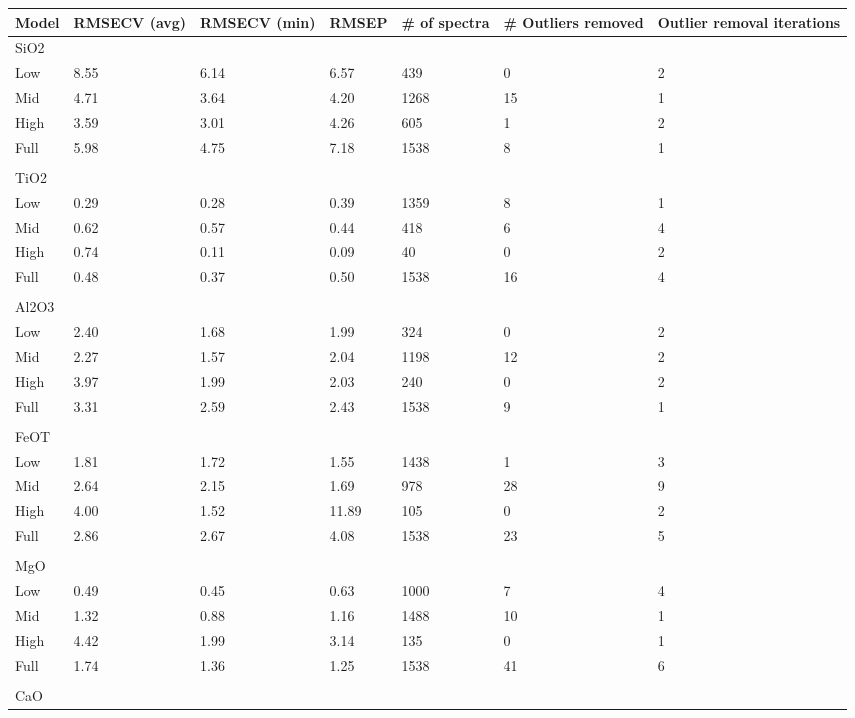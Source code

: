 \begin{table}[htbp] %
\centering
\begin{tabular*}{\textwidth}{@{\extracolsep{\fill}} lllllll}
\hline
Model & RMSECV (avg) & RMSECV (min) & RMSEP & \# of spectra & \# Outliers removed & Outlier removal iterations  \\
\hline
SiO2 &&&&&& \\
  Low & 8.55 & 6.14 & 6.57 & 439 & 0 & 2 \\
  Mid & 4.71 & 3.64 & 4.20 & 1268 & 15 & 1 \\
  High & 3.59 & 3.01 & 4.26 & 605 & 1 & 2 \\
  Full & 5.98 & 4.75 & 7.18 & 1538 & 8 & 1 \\
\\
TiO2 &&&&&& \\
  Low & 0.29 & 0.28 & 0.39 & 1359 & 8 & 1 \\
  Mid & 0.62 & 0.57 & 0.44 & 418 & 6 & 4 \\
  High & 0.74 & 0.11 & 0.09 & 40 & 0 & 2 \\
  Full & 0.48 & 0.37 & 0.50 & 1538 & 16 & 4 \\
\\
Al2O3 &&&&&& \\
  Low & 2.40 & 1.68 & 1.99 & 324 & 0 & 2 \\
  Mid & 2.27 & 1.57 & 2.04 & 1198 & 12 & 2 \\
  High & 3.97 & 1.99 & 2.03 & 240 & 0 & 2 \\
  Full & 3.31 & 2.59 & 2.43 & 1538 & 9 & 1 \\
\\
FeOT &&&&&& \\
  Low & 1.81 & 1.72 & 1.55 & 1438 & 1 & 3 \\
  Mid & 2.64 & 2.15 & 1.69 & 978 & 28 & 9 \\
  High & 4.00 & 1.52 & 11.89 & 105 & 0 & 2 \\
  Full & 2.86 & 2.67 & 4.08 & 1538 & 23 & 5 \\
\\
MgO &&&&&& \\
  Low & 0.49 & 0.45 & 0.63 & 1000 & 7 & 4 \\
  Mid & 1.32 & 0.88 & 1.16 & 1488 & 10 & 1 \\
  High & 4.42 & 1.99 & 3.14 & 135 & 0 & 1 \\
  Full & 1.74 & 1.36 & 1.25 & 1538 & 41 & 6 \\
\\
CaO &&&&&& \\

\end{tabular*}
\end{table}
